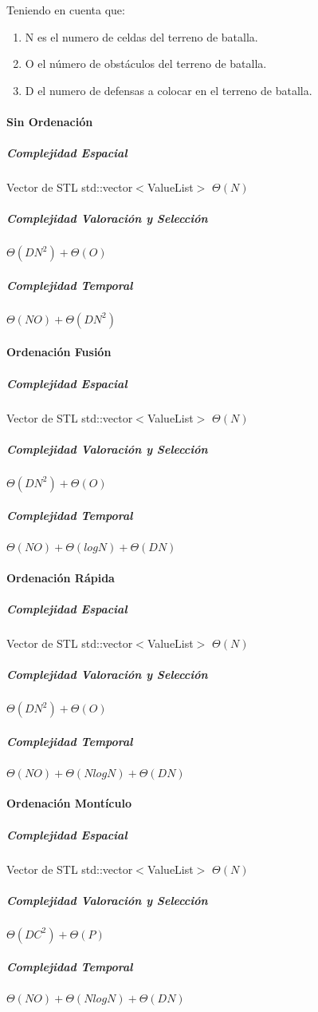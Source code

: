 Teniendo en cuenta que:
\begin{enumerate}
	\item N es el numero de celdas del terreno de batalla.
	\item O el número de obstáculos del terreno de batalla.
	\item D el numero de defensas a colocar en el terreno de batalla.
\end{enumerate}

\paragraph{Sin Ordenación}
\subparagraph{Complejidad Espacial}
Vector de STL std::vector$<$ValueList$>$ $\Theta(N)$

\subparagraph{Complejidad Valoración y Selección}
$\Theta(DN^2) + \Theta(O)$

\subparagraph{Complejidad Temporal}
$\Theta(NO) + \Theta(DN^2)$

\paragraph{Ordenación Fusión}
\subparagraph{Complejidad Espacial}
Vector de STL std::vector$<$ValueList$>$ $\Theta(N)$

\subparagraph{Complejidad Valoración y Selección}
$\Theta(DN^2) + \Theta(O)$

\subparagraph{Complejidad Temporal}
$\Theta(NO) + \Theta(log N) + \Theta(DN)$

\paragraph{Ordenación Rápida}
\subparagraph{Complejidad Espacial}
Vector de STL std::vector$<$ValueList$>$ $\Theta(N)$

\subparagraph{Complejidad Valoración y Selección}
$\Theta(DN^2) + \Theta(O)$

\subparagraph{Complejidad Temporal}
$\Theta(NO) + \Theta(N log N) + \Theta(DN)$

\paragraph{Ordenación Montículo}
\subparagraph{Complejidad Espacial}
Vector de STL std::vector$<$ValueList$>$ $\Theta(N)$

\subparagraph{Complejidad Valoración y Selección}
$\Theta(DC^2) + \Theta(P)$

\subparagraph{Complejidad Temporal}
$\Theta(NO) + \Theta(N log N) + \Theta(DN)$